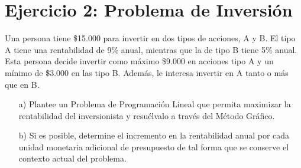 \documentclass[letterpaper,11pt,oneside]{article}
\begin{document}
\section*{Ejercicio 2: Problema de Inversión}

Una persona tiene \$15.000 para invertir en dos tipos de acciones, A y B. El tipo A tiene una rentabilidad de 9\% anual, mientras que la de tipo B tiene 5\% anual. Esta persona decide invertir como máximo \$9.000 en acciones tipo A y un mínimo de \$3.000 en las tipo B. Además, le interesa invertir en A tanto o más que en B.

\begin{itemize}
	\item[a)] Plantee un Problema de Programación Lineal que permita maximizar la rentabilidad del inversionista y resuélvalo a través del Método Gráfico.
	\item[b)] Si es posible, determine el incremento en la rentabilidad anual por cada unidad monetaria adicional de presupuesto de tal forma que se conserve el contexto actual del problema.
\end{itemize}
\end{document}
